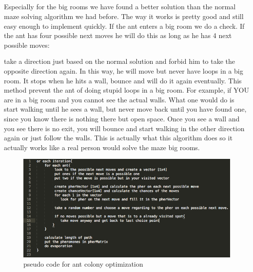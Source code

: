 \documentclass{scrartcl}
\begin{document}
\subsection{}
Especially for the big rooms we have found a better solution than the normal maze solving algorithm we had before. The way it works is pretty good and still easy enough to implement quickly. If the ant enters a big room we do a check. If the ant has four possible next moves he will do this as long as he has 4 next possible moves:\par
take a direction just based on the normal solution and forbid him to take the opposite direction again.
In this way, he will move but never have loops in a big room. It stops when he hits a wall, bounce and will do it again eventually. This method prevent the ant of doing stupid loops in a big room. For example, if YOU are in a big room and you cannot see the actual walls. What one would do is start walking until he sees a wall, but never move back until you have found one, since you know there is nothing there but open space. Once you see a wall and you see there is no exit, you will bounce and start walking in the other direction again or just follow the walls. This is actually what this algorithm does so it actually works like a real person would solve the maze big rooms.


 
 \begin{figure}[p]
    \centering
    \includegraphics[width=1\textwidth]{pseudo.PNG}
    \caption{pseudo code for ant colony optimization}
    \label{fig:speudo}
\end{figure}
 
 	
		 
		 
		
 
\end{document}
